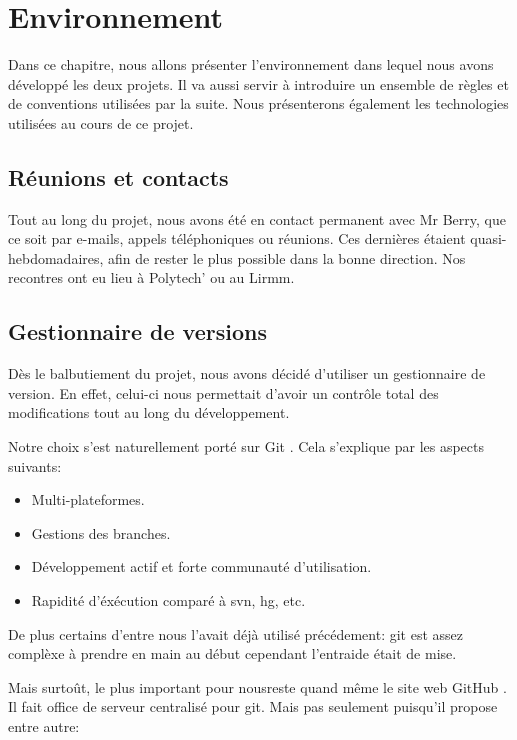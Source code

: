 \chapter{Environnement}

Dans ce chapitre, nous allons présenter l'environnement dans lequel nous avons
développé les deux projets. Il va aussi servir à introduire un ensemble de
règles et de conventions utilisées par la suite.
Nous présenterons également les technologies utilisées au cours de ce projet.

    \section{Réunions et contacts}

Tout au long du projet, nous avons été en contact permanent avec Mr Berry,
que ce soit par e-mails, appels téléphoniques ou réunions. Ces dernières
étaient quasi-hebdomadaires, afin de rester le plus possible dans la
bonne direction. Nos recontres ont eu lieu à Polytech' ou au Lirmm.

    \section{Gestionnaire de versions}

Dès le balbutiement du projet, nous avons décidé d'utiliser un gestionnaire
de version. En effet, celui-ci nous permettait d'avoir un contrôle total des modifications
tout au long du développement.

Notre choix s'est naturellement porté sur Git \cite{git}. Cela s'explique 
par les aspects suivants:

    \begin{itemize}
    \item Multi-plateformes.
    \item Gestions des branches.
    \item Développement actif et forte communauté d'utilisation.
    \item Rapidité d'éxécution comparé à svn, hg, etc. 
    \end{itemize}

    De plus certains d'entre nous l'avait déjà utilisé précédement: git est assez
    complèxe à prendre en main au début cependant l'entraide était de mise.

    Mais surtoût, le plus important pour nousreste quand même le site web GitHub \cite{github}.
    Il fait office de serveur centralisé pour git. Mais pas seulement puisqu'il 
    propose entre autre:

